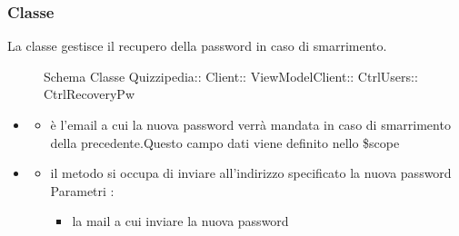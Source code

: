 \subsubsection{Classe }
La classe gestisce il recupero della password in caso di smarrimento.
\begin{figure}[H]
\centering
\noindent{}
\caption[Schema Classe CtrlRecoveryPw]{Schema Classe Quizzipedia:: Client:: ViewModelClient:: CtrlUsers:: CtrlRecoveryPw}
\end{figure}
\begin{itemize}
\item {}
\begin{itemize}
\item {}
\newline
è l'email a cui la nuova password verrà mandata in caso di smarrimento della precedente.Questo campo dati viene definito nello \$scope
\end{itemize}
\item {}
\begin{itemize}
\item {}
\newline
il metodo si occupa di inviare all'indirizzo specificato la nuova password
\newline
Parametri :
\begin{itemize}
\item {}
\newline
la mail a cui inviare la nuova password
\end{itemize}
\end{itemize}
\end{itemize}
